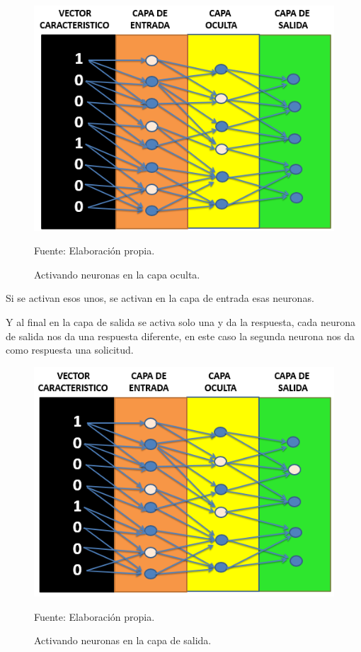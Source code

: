 \begin{figure}[h!]
	\centering
		\includegraphics[scale=0.5]{imagenes/IniciocapaOculta.png}
		\caption{Activando neuronas en la capa oculta.}
	\begin{center}
    Fuente: Elaboración propia.
    \end{center}
	\label{fig:IniciocapaOculta}
\end{figure}
\newpage
Si se activan esos unos, se activan en la capa de entrada esas neuronas.

Y al final en la capa de salida se activa solo una y da la respuesta, cada neurona de salida nos da una respuesta diferente, en este caso la segunda neurona nos da como respuesta una solicitud.

\begin{figure}[h!]
	\centering
		\includegraphics[scale=0.4]{imagenes/IniciocapaSalida.png}
		\caption{Activando neuronas en la capa de salida.}
	\begin{center}
    Fuente: Elaboración propia.
    \end{center}
	\label{fig:IniciocapaSalida}
\end{figure}
\newpage
